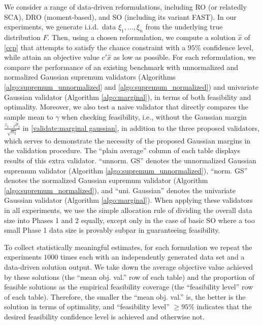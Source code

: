 \documentclass[mnsc,blindrev]{informs4} %
\begin{document}
We consider a range of data-driven reformulations, including RO (or relatedly SCA), DRO (moment-based), and SO (including its variant FAST). In our experiments, we generate i.i.d.~data $\xi_1,\ldots,\xi_n$ from the underlying true distribution $F$. Then, using a chosen reformulation, we compute a solution $\hat x$ of \eqref{ccp} that attempts to satisfy the chance constraint with a $95\%$ confidence level, while attain an objective value $c'\hat x$ as low as possible. For each reformulation, we compare the performance of an existing benchmark with unnormalized and normalized Gaussian supremum validators (Algorithms \ref{algo:supremum_unnormalized} and \ref{algo:supremum_normalized}) and univariate Gaussian validator (Algorithm \ref{algo:marginal}), in terms of both feasibility and optimality. Moreover, we also test a naive validator that directly compares the sample mean to $\gamma$ when checking feasibility, i.e., without the Gaussian margin $\frac{z_{1-\beta}\hat{\sigma}_j}{\sqrt{n_2}}$ in \eqref{validate:marginal gaussian}, in addition to the three proposed validators, which serves to demonstrate the necessity of the proposed Gaussian margins in the validation procedure. The ``plain average'' column of each table displays results of this extra validator. ``unnorm. GS'' denotes the unnormalized Gaussian supremum validator (Algorithm \ref{algo:supremum_unnormalized}), ``norm. GS'' denotes the normalized Gaussian supremum validator (Algorithm \ref{algo:supremum_normalized}), and ``uni. Gaussian'' denotes the univariate Gaussian validator (Algorithm \ref{algo:marginal}). When applying these validators in all experiments, we use the simple allocation rule of dividing the overall data size into Phases 1 and 2 equally, except only in the case of basic SO where a too small Phase 1 data size is provably subpar in guaranteeing feasibility.

To collect statistically meaningful estimates, for each formulation we repeat the experiments $1000$ times each with an independently generated data set and a data-driven solution output. We take down the average objective value achieved by these solutions (the ``mean obj. val.'' row of each table) and the proportion of feasible solutions as the empirical feasibility coverage (the ``feasibility level'' row of each table). Therefore, the smaller the ``mean obj. val.'' is, the better is the solution in terms of optimality, and ``feasibility level'' $\geq 95\%$ indicates that the desired feasibility confidence level is achieved and otherwise not.
\end{document}
